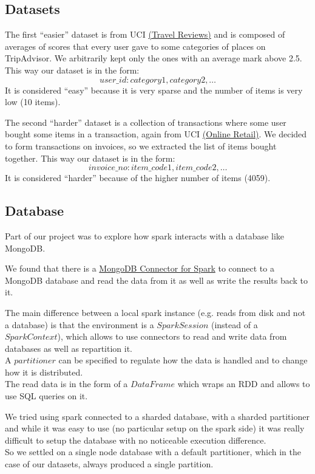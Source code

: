 \documentclass[a4paper]{article}
\begin{document}
	\subsection{Datasets}
	The first ``easier'' dataset is from UCI \href{https://archive.ics.uci.edu/ml/datasets/Travel+Reviews#}{(Travel Reviews)} and is composed of averages of scores that every user gave to some
	categories of places on TripAdvisor. We arbitrarily kept only the ones with an average mark above 2.5. This way our dataset is in the form:
	\[ user\_id: category1, category2, \ldots \]
	It is considered ``easy'' because it is very sparse and the number of items is very low (10 items).

	The second ``harder'' dataset is a collection of transactions where some user bought some items in a transaction, again from UCI \href{https://archive.ics.uci.edu/ml/datasets/online+retail}{(Online Retail)}.
	We decided to form transactions on invoices, so we extracted the list of items bought together.
	This way our dataset is in the form:
	\[ invoice\_no: item\_code1, item\_code2, \ldots \]
	It is considered ``harder'' because of the higher number of items (4059).

	\subsection{Database}
	Part of our project was to explore how spark interacts with a database like MongoDB.
	
	We found that there is a \href{https://www.mongodb.com/docs/spark-connector/current/}{MongoDB Connector for Spark} to connect to a MongoDB database and read the data from it as well as 	write the results back to it.
	
	The main difference between a local spark instance (e.g. reads from disk and not a database) is that the environment is a $SparkSession$ (instead of a $SparkContext$), which allows to use connectors to read and write data from databases as well as repartition it.\\
	A $partitioner$ can be specified to regulate how the data is handled and to change how it is distributed.\\	
	The read data is in the form of a $DataFrame$ which wraps an RDD and allows to use SQL queries on it.

	We tried using spark connected to a sharded database, with a sharded partitioner and while it was easy to use (no particular setup on the spark side) it was really difficult to setup the database with no noticeable execution difference.\\
	So we settled on a single node database with a default partitioner, which in the case of our datasets, always produced a single partition.\\
\end{document}
